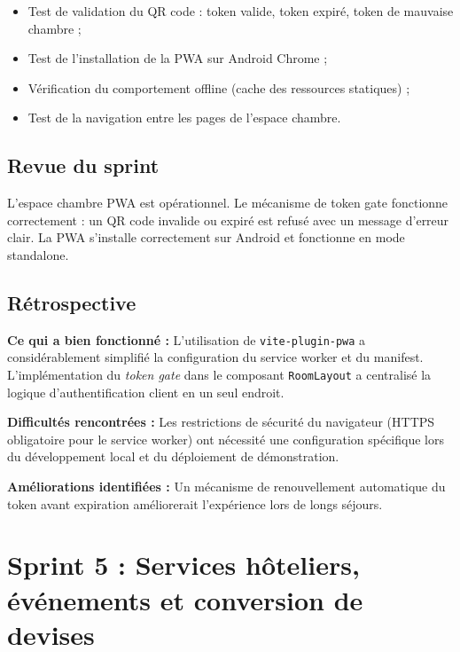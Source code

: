 \begin{itemize}
  \item Test de validation du QR code : token valide, token expiré, token de mauvaise chambre ;
  \item Test de l'installation de la PWA sur Android Chrome ;
  \item Vérification du comportement offline (cache des ressources statiques) ;
  \item Test de la navigation entre les pages de l'espace chambre.
\end{itemize}

\subsection{Revue du sprint}

L'espace chambre PWA est opérationnel. Le mécanisme de token gate fonctionne correctement : un QR code invalide ou expiré est refusé avec un message d'erreur clair. La PWA s'installe correctement sur Android et fonctionne en mode standalone.

\subsection{Rétrospective}

\textbf{Ce qui a bien fonctionné :} L'utilisation de \texttt{vite-plugin-pwa} a considérablement simplifié la configuration du service worker et du manifest. L'implémentation du \textit{token gate} dans le composant \texttt{RoomLayout} a centralisé la logique d'authentification client en un seul endroit.

\textbf{Difficultés rencontrées :} Les restrictions de sécurité du navigateur (HTTPS obligatoire pour le service worker) ont nécessité une configuration spécifique lors du développement local et du déploiement de démonstration.

\textbf{Améliorations identifiées :} Un mécanisme de renouvellement automatique du token avant expiration améliorerait l'expérience lors de longs séjours.

\section{Sprint 5 : Services hôteliers, événements et conversion de devises}
\label{sec:sprint5}

